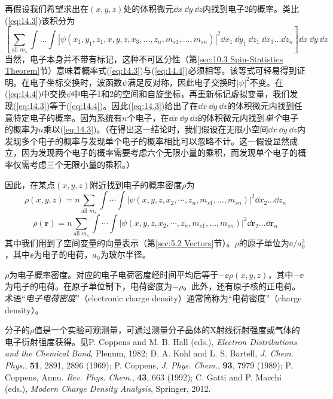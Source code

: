     再假设我们希望求出在$\left(x,y,z\right)$处的体积微元$\dd x\:\dd y\:\dd z$内找到电子2的概率。类比(\ref{eq:14.3})该积分为
    \begin{equation}
        \left[\sum_{\text{all } m_s} \int \ldots \int \left|\psi\left(x_1,y_1,z_1,x,y,z,x_3,\ldots,z_n,m_{s1},\ldots,m_{sn}\right)\right|^2 \dd x_1\: \dd y_1 \:\dd z_1 \:\dd x_3 \ldots \dd z_n\right]\dd x\:\dd y\:\dd z
        \label{eq:14.4}
    \end{equation}
    当然，电子本身并不带有标记，这种不可区分性（第\ref{sec:10.3 Spin-Statistics Theorem}节）意味着概率式(\ref{eq:14.3})与(\ref{eq:14.4})必须相等。该等式可轻易得到证明。在电子坐标交换时，波函数$\psi$满足反对称，因此电子交换时$\left|\psi\right|^2$不变。在(\ref{eq:14.4})中交换$\psi$中电子1和2的空间和自旋坐标，再重新标记虚拟变量，我们发现(\ref{eq:14.3})等于(\ref{eq:14.4})。因此(\ref{eq:14.3})给出了在$\dd x\:\dd y\:\dd z$的体积微元内找到任意特定电子的概率。因为系统有$n$个电子，在$\dd x\:\dd y\:\dd z$的体积微元内找到\textit{单个}电子的概率为$n$乘以(\ref{eq:14.3})。（在得出这一结论时，我们假设在无限小空间$\dd x\:\dd y\:\dd z$内发现多个电子的概率与发现单个电子的概率相比可以忽略不计。这一假设显然成立，因为发现两个电子的概率需要考虑六个无限小量的乘积，而发现单个电子的概率仅需考虑三个无限小量的乘积。）

    因此，在某点$\left(x,y,z\right)$附近找到电子的概率密度$\rho$为
    \begin{equation*}
        \rho\left(x,y,z\right) = n \sum_{\text{all }m_s} \int \cdots \int \left|\psi\left(x,y,z,x_2, \cdots, z_n, m_{s1}, \dots, m_{sn}\right)\right|^2 \dd x_2 \ldots \dd z_n
    \end{equation*}
    \begin{equation}
        \rho\left(\mathbf{r}\right) = n \sum_{\text{all }m_s} \int \cdots \int \left|\psi\left(x,y,z,x_2, \cdots, z_n, m_{s1}, \dots, m_{sn}\right)\right|^2 \dd \mathbf{r}_2\ldots \dd \mathbf{r}_n
        \label{eq:14.5}
    \end{equation}
    其中我们用到了空间变量的向量表示（第\ref{sec:5.2 Vectors}节）。$\rho$的原子单位为$\ee /a_0^3$，其中$\ee $为电子的电荷，$a_0$为玻尔半径。

    $\rho$为电子概率密度。对应的电子电荷密度经时间平均后等于$-\ee \rho\left(x,y,z\right)$，其中$-\ee $为电子的电荷。在原子单位制下，电荷密度为$-\rho$。此外，还有原子核的正电荷。术语“\textit{电子电荷密度}”（electronic charge density）通常简称为“电荷密度”（charge density）。

    分子的$\rho$值是一个实验可观测量，可通过测量分子晶体的X射线衍射强度或气体的电子衍射强度获得。见P. Coppens and M. B. Hall (eds.), \textit{Electron Distributions and the Chemical Bond}, Plenum, 1982; D. A. Kohl and L. S. Bartell, \textit{J. Chem. Phys.}, \textbf{51}, 2891, 2896 (1969); P. Coppens, \textit{J. Phys. Chem.}, \textbf{93}, 7979 (1989); P. Coppens, Annu. \textit{Rev. Phys. Chem.}, \textbf{43}, 663 (1992); C. Gatti and P. Macchi (eds.), \textit{Modern Charge Density Analysis}, Springer, 2012.

